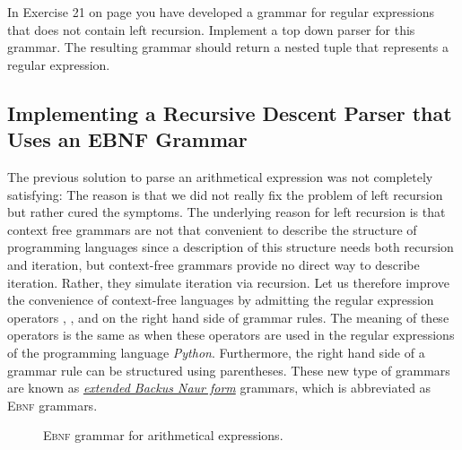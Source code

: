 \exerciseEng
In Exercise 21 on page \pageref{exercise:regexp} you have developed a grammar for regular expressions that does
not contain left recursion.  Implement a top down parser for this grammar.  The resulting grammar should return
a nested tuple that represents a regular expression.
\eox

\subsection{Implementing a Recursive Descent Parser that Uses an \textsc{EBNF} Grammar}
The previous solution to parse an arithmetical expression was not completely
satisfying:  The reason is that we did not really fix the problem of left recursion but rather cured the
symptoms.  The underlying reason for left recursion is that context free grammars are not that convenient to
describe the structure of programming languages since a description of this structure needs both
recursion and iteration, but context-free grammars provide no direct way to describe iteration.
Rather, they simulate iteration via recursion.  Let us therefore improve the convenience of context-free
languages by admitting the regular expression operators \squoted{*}, \squoted{|}, and  on
the right hand side of grammar rules.  The meaning of these operators is the same as when these operators are used in 
the regular expressions of the programming language \textsl{Python}.  Furthermore, the right hand side of a
grammar rule can be structured using parentheses.  These new type of grammars are known as
\href{http://en.wikipedia.org/wiki/Extended_Backus_Naur_Form}{\emph{extended Backus Naur form}}
 grammars, which is abbreviated as \textsc{Ebnf} grammars.



\begin{figure}[htbp]
  \begin{center}    
  \end{center}
  \caption{\textsc{Ebnf} grammar for arithmetical expressions.}
  \label{fig:arith-expr-ebnf}
\end{figure}

